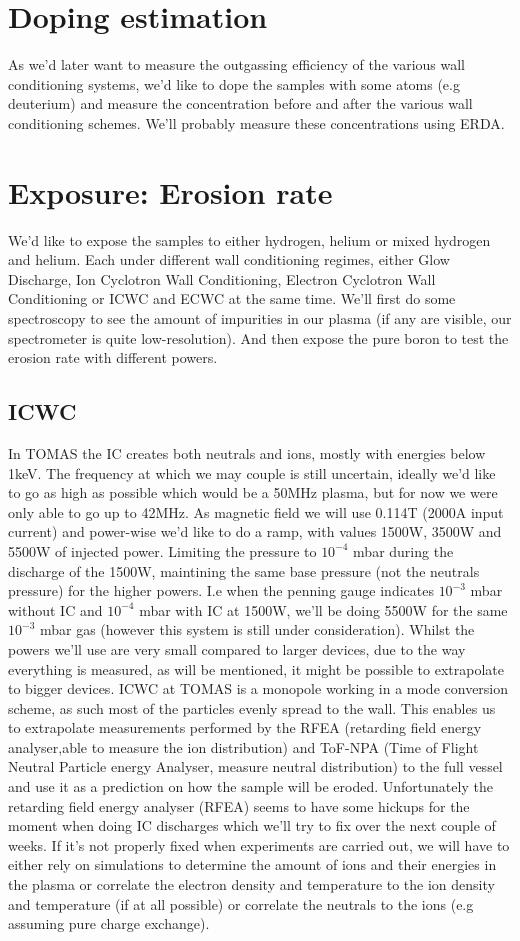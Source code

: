 \documentclass{article}
\begin{document}
\section{Doping estimation}
As we'd later want to measure the outgassing efficiency of the various wall conditioning 
systems, we'd like to dope the samples with some atoms (e.g deuterium) and measure the concentration
before and after the various wall conditioning schemes.
We'll probably measure these concentrations using ERDA.
\section{Exposure: Erosion rate}
We'd like to expose the samples to either hydrogen, helium or mixed hydrogen
and helium. Each under different wall conditioning regimes, either Glow Discharge,
Ion Cyclotron Wall Conditioning, Electron Cyclotron Wall Conditioning or ICWC and ECWC
at the same time. We'll first do some spectroscopy to see the amount of impurities in
our plasma (if any are visible, our spectrometer is quite low-resolution). And then
expose the pure boron to test the erosion rate with different powers.
\subsection{ICWC}
In TOMAS the IC creates both neutrals and ions, mostly with energies below
1keV.  The frequency at which we may couple is still uncertain, ideally we'd like to
go as high as possible which would be a 50MHz plasma, but for now we were only able to go up to 42MHz. 
As magnetic field we will use 0.114T (2000A input current) and power-wise we'd
like to do a ramp, with values 1500W, 3500W and 5500W of injected power. 
Limiting the pressure to $10^{-4}$ mbar during the discharge of the
1500W, maintining the same base pressure (not the neutrals pressure) for the
higher powers. I.e when the penning gauge indicates $10^{-3}$ mbar without IC
and $10^{-4}$ mbar with IC at 1500W, we'll be doing 5500W for the same
$10^{-3}$ mbar gas (however this system is still under consideration). 
Whilst the powers we'll use are very small compared to
larger devices, due to the way everything is measured, as will be mentioned, it
might be possible to extrapolate to bigger devices.  ICWC at TOMAS is a
monopole working in a mode conversion scheme, as such most of the particles
evenly spread to the wall.  This enables us to extrapolate measurements
performed by the RFEA (retarding field energy analyser,able to  measure the ion distribution) 
and ToF-NPA (Time of Flight Neutral Particle energy Analyser, measure neutral distribution) 
to the full vessel and use it as a prediction on how the sample will be eroded. 
Unfortunately the retarding field energy analyser (RFEA) seems to have some
hickups for the moment when doing IC discharges which we'll try to fix over the
next couple of weeks.  If it's not properly fixed when experiments are carried
out, we will have to either rely on simulations to determine the amount of ions and
their energies in the plasma or correlate the electron density and temperature to the
ion density and temperature (if at all possible) or correlate the neutrals to the ions
(e.g assuming pure charge exchange).
\end{document}
